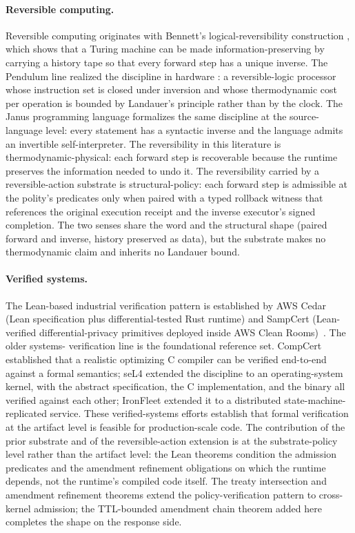 \paragraph{Reversible computing.}
Reversible computing originates with Bennett's logical-reversibility
construction \cite{bennett1973logical}, which shows that a Turing
machine can be made information-preserving by carrying a history tape
so that every forward step has a unique inverse. The Pendulum line
realized the discipline in hardware
\cite{vieri1999pendulum}: a reversible-logic processor whose
instruction set is closed under inversion and whose thermodynamic cost
per operation is bounded by Landauer's principle rather than by the
clock. The Janus programming language
\cite{yokoyama2007janus} formalizes the same discipline at the
source-language level: every statement has a syntactic inverse and the
language admits an invertible self-interpreter. The reversibility in
this literature is thermodynamic-physical: each forward step is
recoverable because the runtime preserves the information needed to
undo it. The reversibility carried by a reversible-action substrate is
structural-policy: each forward step is admissible at the polity's
predicates only when paired with a typed rollback witness that
references the original execution receipt and the inverse executor's
signed completion. The two senses share the word and the structural
shape (paired forward and inverse, history preserved as data), but the
substrate makes no thermodynamic claim and inherits no Landauer bound.

\paragraph{Verified systems.}
The Lean-based industrial verification pattern is established by AWS
Cedar (Lean specification plus differential-tested Rust runtime) and
SampCert (Lean-verified differential-privacy primitives deployed
inside AWS Clean Rooms)~\cite{cutler2024cedar}. The older systems-
verification line is the foundational reference set. CompCert
\cite{leroy2009compcert} established that a realistic optimizing C
compiler can be verified end-to-end against a formal semantics; seL4
\cite{klein2009sel4} extended the discipline to an operating-system
kernel, with the abstract specification, the C implementation, and the
binary all verified against each other; IronFleet
\cite{hawblitzel2015ironfleet} extended it to a distributed
state-machine-replicated service. These verified-systems efforts
establish that formal verification at the artifact level is feasible
for production-scale code. The contribution of the prior substrate
\cite{programmableSovereigntyAnonymous} and of the reversible-action
extension is at the substrate-policy level rather than the artifact
level: the Lean theorems condition the admission predicates and the
amendment refinement obligations on which the runtime depends, not the
runtime's compiled code itself. The treaty intersection and amendment
refinement theorems extend the policy-verification pattern to
cross-kernel admission; the TTL-bounded amendment chain theorem added
here completes the shape on the response side.

